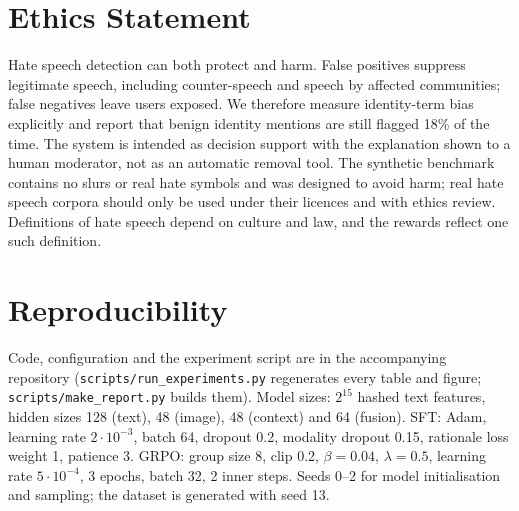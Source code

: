 \documentclass[11pt]{article}
\begin{document}
\section*{Ethics Statement}
Hate speech detection can both protect and harm. False positives suppress legitimate speech, including counter-speech and speech by affected communities; false negatives leave users exposed. We therefore measure identity-term bias explicitly
and report that benign identity mentions are still flagged 18\% of the time. The system is intended as decision support with the explanation shown to a human moderator, not as an automatic removal tool. The synthetic benchmark contains no slurs or real
hate symbols and was designed to avoid harm; real hate speech corpora should only be used under their licences and with ethics review. Definitions of hate speech depend on culture and law, and the rewards reflect one such definition.



\appendix
\section{Reproducibility}
Code, configuration and the experiment script are in the accompanying repository (\texttt{scripts/run\_experiments.py} regenerates every table and figure; \texttt{scripts/make\_report.py} builds them).
Model sizes: $2^{15}$ hashed text features, hidden sizes 128 (text), 48 (image), 48 (context) and 64 (fusion). SFT: Adam, learning rate $2\cdot10^{-3}$, batch 64, dropout 0.2, modality dropout 0.15, rationale loss weight 1, patience 3.
GRPO: group size 8, clip 0.2, $\beta{=}0.04$, $\lambda{=}0.5$, learning rate $5\cdot10^{-4}$, 3 epochs, batch 32, 2 inner steps. Seeds 0--2 for model initialisation and sampling; the dataset is generated with seed 13.
\end{document}
